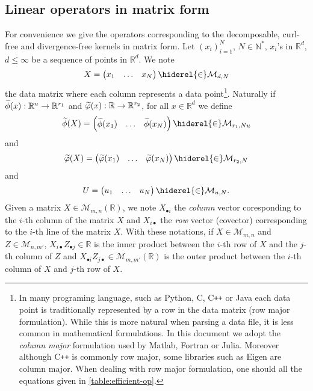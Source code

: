 \subsection{Linear operators in matrix form}
\label{subsec:efficient_linop}
For convenience we give the operators corresponding to the decomposable,
curl-free and divergence-free kernels in matrix form. Let $(x_i)_{i=1}^N$,
$N\in\mathbb{N}^*$, $x_i$'s in $\mathbb{R}^d$, $d\le\infty$ be a sequence of
points in $\mathbb{R}^d$. We note
\begin{dmath*}
    X=\begin{pmatrix}x_1 & \hdots &
    x_N\end{pmatrix}\hiderel{\in}\mathcal{M}_{d,N}
\end{dmath*}
the data matrix where each column represents a data point\footnote{In many
programing language, such as Python, C, C{}\verb!++! or Java each data point is
traditionally represented by a row in the data matrix (row major formulation).
While this is more natural when parsing a data file, it is less common in
mathematical formulations. In this document we adopt the \emph{column major}
formulation used by Matlab, Fortran or Julia. Moreover although C{}\verb!++! is
commonly row major, some libraries such as Eigen are column major. When dealing
with row major formulation, one should  all the equations given
in \cref{table:efficient-op}.}. Naturally if
$\tildePhi{\omega}(x):\mathbb{R}^u\to\mathbb{R}^{r_1}$ and
$\widetilde{\varphi}(x):\mathbb{R}\to\mathbb{R}^{r_2}$, for all
$x\in\mathbb{R}^d$ we define
\begin{dmath*}
    \tildePhi{\omega}(X)=\begin{pmatrix}\tildePhi{\omega}(x_1) & \hdots &
    \tildePhi{\omega}(x_N)\end{pmatrix}\hiderel{\in}\mathcal{M}_{r_1,Nu}
\end{dmath*}
and
\begin{dmath*}
    \tildephi{\omega}(X)=\begin{pmatrix}\tildephi{\omega}(x_1) & \hdots &
    \tildephi{\omega}(x_N)\end{pmatrix}\hiderel{\in}\mathcal{M}_{r_2, N}
\end{dmath*}
and
\begin{dmath*}
    U=\begin{pmatrix} u_1 & \hdots&  u_N
    \end{pmatrix}\hiderel{\in}\mathcal{M}_{u, N}.
\end{dmath*}
Given a matrix $X\in\mathcal{M}_{m,n}(\mathbb{R})$, we note $X_{\bullet i}$ the
\emph{column} vector coresponding to the $i$-th column of the matrix $X$ and
$X_{i \bullet}$ the \emph{row} vector (covector) corresponding to the $i$-th
line of the matrix $X$. With these notations, if $X\in\mathcal{M}_{m,n}$ and
$Z\in\mathcal{M}_{n,m'}$, $X_{i\bullet}Z_{\bullet j}\in\mathbb{R}$ is the inner
product between the $i$-th row of $X$ and the $j$-th column of $Z$ and
$X_{\bullet i} Z_{j \bullet}\in\mathcal{M}_{m,m'}(\mathbb{R})$ is the outer
product between the $i$-th column of $X$ and $j$-th row of $X$.
